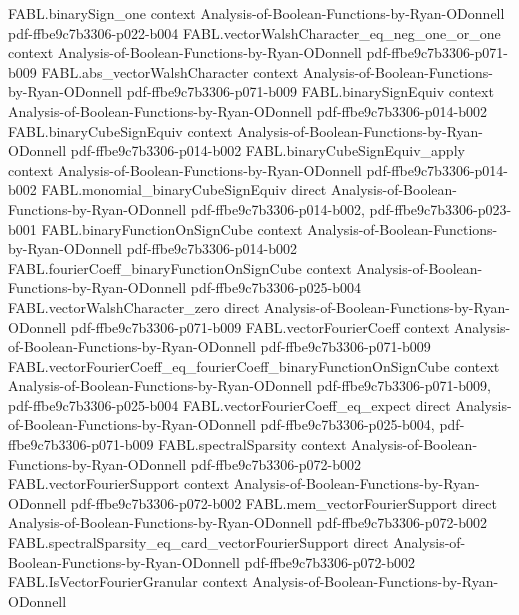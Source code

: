 \begin{theorem}
\proofstep
  {FABL.binarySign_one}
  {context}
  {Analysis-of-Boolean-Functions-by-Ryan-ODonnell}
  {pdf-ffbe9c7b3306-p022-b004}
\proofstep
  {FABL.vectorWalshCharacter_eq_neg_one_or_one}
  {context}
  {Analysis-of-Boolean-Functions-by-Ryan-ODonnell}
  {pdf-ffbe9c7b3306-p071-b009}
\proofstep
  {FABL.abs_vectorWalshCharacter}
  {context}
  {Analysis-of-Boolean-Functions-by-Ryan-ODonnell}
  {pdf-ffbe9c7b3306-p071-b009}
\proofstep
  {FABL.binarySignEquiv}
  {context}
  {Analysis-of-Boolean-Functions-by-Ryan-ODonnell}
  {pdf-ffbe9c7b3306-p014-b002}
\proofstep
  {FABL.binaryCubeSignEquiv}
  {context}
  {Analysis-of-Boolean-Functions-by-Ryan-ODonnell}
  {pdf-ffbe9c7b3306-p014-b002}
\proofstep
  {FABL.binaryCubeSignEquiv_apply}
  {context}
  {Analysis-of-Boolean-Functions-by-Ryan-ODonnell}
  {pdf-ffbe9c7b3306-p014-b002}
\proofstep
  {FABL.monomial_binaryCubeSignEquiv}
  {direct}
  {Analysis-of-Boolean-Functions-by-Ryan-ODonnell}
  {pdf-ffbe9c7b3306-p014-b002,
    pdf-ffbe9c7b3306-p023-b001}
\proofstep
  {FABL.binaryFunctionOnSignCube}
  {context}
  {Analysis-of-Boolean-Functions-by-Ryan-ODonnell}
  {pdf-ffbe9c7b3306-p014-b002}
\proofstep
  {FABL.fourierCoeff_binaryFunctionOnSignCube}
  {context}
  {Analysis-of-Boolean-Functions-by-Ryan-ODonnell}
  {pdf-ffbe9c7b3306-p025-b004}
\proofstep
  {FABL.vectorWalshCharacter_zero}
  {direct}
  {Analysis-of-Boolean-Functions-by-Ryan-ODonnell}
  {pdf-ffbe9c7b3306-p071-b009}
\proofstep
  {FABL.vectorFourierCoeff}
  {context}
  {Analysis-of-Boolean-Functions-by-Ryan-ODonnell}
  {pdf-ffbe9c7b3306-p071-b009}
\proofstep
  {FABL.vectorFourierCoeff_eq_fourierCoeff_binaryFunctionOnSignCube}
  {context}
  {Analysis-of-Boolean-Functions-by-Ryan-ODonnell}
  {pdf-ffbe9c7b3306-p071-b009,
    pdf-ffbe9c7b3306-p025-b004}
\proofstep
  {FABL.vectorFourierCoeff_eq_expect}
  {direct}
  {Analysis-of-Boolean-Functions-by-Ryan-ODonnell}
  {pdf-ffbe9c7b3306-p025-b004,
    pdf-ffbe9c7b3306-p071-b009}
\proofstep
  {FABL.spectralSparsity}
  {context}
  {Analysis-of-Boolean-Functions-by-Ryan-ODonnell}
  {pdf-ffbe9c7b3306-p072-b002}
\proofstep
  {FABL.vectorFourierSupport}
  {context}
  {Analysis-of-Boolean-Functions-by-Ryan-ODonnell}
  {pdf-ffbe9c7b3306-p072-b002}
\proofstep
  {FABL.mem_vectorFourierSupport}
  {direct}
  {Analysis-of-Boolean-Functions-by-Ryan-ODonnell}
  {pdf-ffbe9c7b3306-p072-b002}
\proofstep
  {FABL.spectralSparsity_eq_card_vectorFourierSupport}
  {direct}
  {Analysis-of-Boolean-Functions-by-Ryan-ODonnell}
  {pdf-ffbe9c7b3306-p072-b002}
\proofstep
  {FABL.IsVectorFourierGranular}
  {context}
  {Analysis-of-Boolean-Functions-by-Ryan-ODonnell}

\end{theorem}
